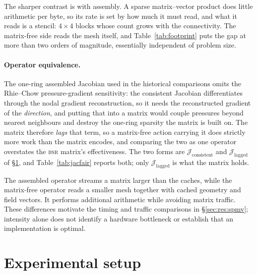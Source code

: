 \documentclass[sigconf,nonacm]{acmart}
\newcommand{\Jlag}{\mathcal{J}_{\mathrm{lagged}}}
\newcommand{\Jex}{\mathcal{J}_{\mathrm{consistent}}}
\begin{document}
The sharper contrast is with assembly. A sparse matrix--vector product does little arithmetic per
byte, so its rate is set by how much it must read, and what it reads is a stencil: $4\times4$
blocks whose count grows with the connectivity. The matrix-free side reads the mesh itself, and
Table~\ref{tab:footprint} puts the gap at more than two orders of magnitude, essentially
independent of problem size.

\paragraph{Operator equivalence.}
The one-ring assembled Jacobian used in the historical comparisons omits the Rhie--Chow pressure-gradient sensitivity: the consistent
Jacobian differentiates through the nodal gradient reconstruction, so it needs the reconstructed
gradient of the \emph{direction}, and putting that into a matrix would couple pressures beyond
nearest neighbours and destroy the one-ring sparsity the matrix is built on. The matrix therefore
\emph{lags} that term, so a matrix-free action carrying it does strictly more work than the
matrix encodes, and comparing the two as one operator overstates the \textsc{bsr} matrix's
effectiveness. The two forms are $\Jex$ and $\Jlag$ of \S\ref{sec:setup}, and
Table~\ref{tab:jacfair} reports both; only $\Jlag$ is what the matrix holds.

The assembled operator streams a matrix larger than the caches, while the
matrix-free operator reads a smaller mesh together with cached geometry and
field vectors. It performs additional arithmetic while avoiding matrix traffic. These differences motivate the timing and traffic
comparisons in \S\ref{sec:res:spmv}; intensity alone does not identify a
hardware bottleneck or establish that an implementation is optimal.

\section{Experimental setup}
\label{sec:setup}
\end{document}
